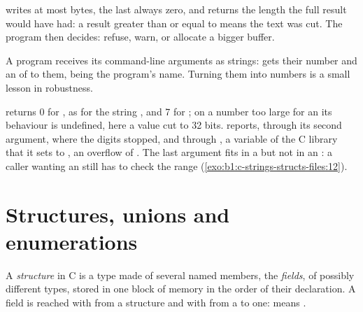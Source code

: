 
 writes at most  bytes, the last always zero, and returns the length
the full result would have had: a result greater than or equal to  means the text was cut. The program then
decides: refuse, warn, or allocate a bigger buffer.

A program receives its command-line arguments as strings:  gets their number and an
 of  to them,  being the program's name. Turning them into numbers is a small lesson in
robustness.

\label{lst:b1:c-strings-structs-files:args}

\label{out:b1:c-strings-structs-files:args}

 returns 0 for , as for the string , and 7 for ; on a number too large for an
 its behaviour is undefined, here a value cut to 32 bits.  reports, through its second argument,
where the digits stopped, and through , a variable of the C library that it sets to , an
overflow of . The last argument fits in a  but not in an : a caller wanting an
 still has to check the range (\cref{exo:b1:c-strings-structs-files:12}).

\section{Structures, unions and enumerations}\label{sec:b1:c-strings-structs-files:structs}

\begin{definition}\label{def:b1:c-strings-structs-files:struct}
A \emph{structure} in C is a type made of several named members, the \emph{fields}, of possibly different types, stored in one block of memory in the order of their declaration. A
field is reached with  from a structure and with \code{->} from a  to one:  means
.
\end{definition}

